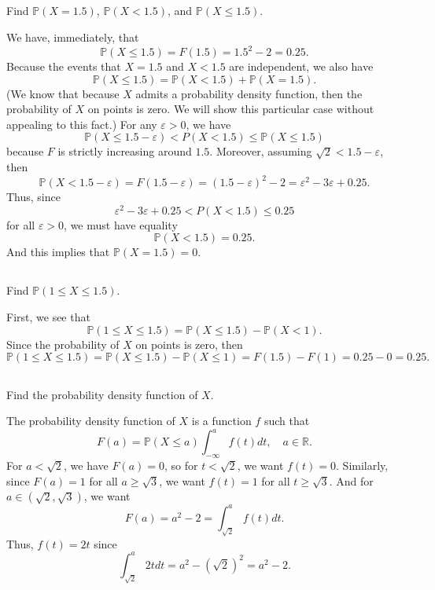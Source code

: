 \documentclass[12pt]{article}
\newenvironment{problem}
    {\begin{lrbox}{\mybox}\begin{minipage}{0.98\textwidth}}
    {\end{minipage}\end{lrbox}\framebox[\textwidth]{\usebox{\mybox}}}
\newcommand{\eps}{\varepsilon}
\newcommand{\R}{\mathbb{R}}
\renewcommand{\P}{\mathbb{P}}
\begin{document}
\newpage
\subsection{}
\begin{problem}
    Find $\P(X = 1.5)$, $\P(X < 1.5)$, and $\P(X \leq 1.5)$.
\end{problem}
\medskip

We have, immediately, that
\[
    \P(X \leq 1.5) = F(1.5) = 1.5^2 - 2 = 0.25.
\]
Because the events that $X = 1.5$ and $X < 1.5$ are independent, we also have
\[
    \P(X \leq 1.5) = \P(X < 1.5) + \P(X = 1.5).
\]
(We know that because $X$ admits a probability density function, then the probability of $X$ on points is zero. We will show this particular case without appealing to this fact.) For any $\eps > 0$, we have
\[
    \P(X \leq 1.5 - \eps) < P(X < 1.5) \leq \P(X \leq 1.5)
\]
because $F$ is strictly increasing around $1.5$. Moreover, assuming $\sqrt{2} < 1.5 - \eps$, then
\[
    \P(X < 1.5 - \eps) = F(1.5 - \eps) = (1.5 - \eps)^2 - 2 = \eps^2 - 3\eps + 0.25.
\]
Thus, since
\[
    \eps^2 - 3\eps + 0.25 < P(X < 1.5) \leq 0.25
\]
for all $\eps > 0$, we must have equality
\[
    \P(X < 1.5) = 0.25.
\]
And this implies that $\P(X = 1.5) = 0$.

\subsection{}
\begin{problem}
    Find $\P(1 \leq X \leq 1.5)$.
\end{problem}
\medskip

First, we see that
\[
    \P(1 \leq X \leq 1.5) = \P(X \leq 1.5) - \P(X < 1).
\]
Since the probability of $X$ on points is zero, then
\[
    \P(1 \leq X \leq 1.5) = \P(X \leq 1.5) - \P(X \leq 1) = F(1.5) - F(1) = 0.25 - 0 = 0.25.
\]

\newpage
\subsection{}
\begin{problem}
    Find the probability density function of $X$.
\end{problem}
\medskip

The probability density function of $X$ is a function $f$ such that
\[
    F(a) = \P(X \leq a) \int_{-\infty}^a f(t) dt, \quad a \in \R.
\]
For $a < \sqrt{2}$, we have $F(a) = 0$, so for $t < \sqrt{2}$, we want $f(t) = 0$. Similarly, since $F(a) = 1$ for all $a \geq \sqrt{3}$, we want $f(t) = 1$ for all $t \geq \sqrt{3}$. And for $a \in (\sqrt{2}, \sqrt{3})$, we want
\[
    F(a) = a^2 - 2 = \int_{\sqrt{2}}^a f(t) dt.
\]
Thus, $f(t) = 2t$ since
\[
    \int_{\sqrt{2}}^a 2t dt = a^2 - (\sqrt{2})^2 = a^2 - 2.
\]
\end{document}
